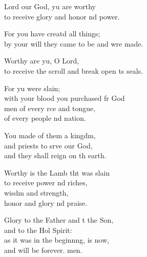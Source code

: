 \settowidth{\versewidth}{to receive the scroll and break open its seals.}
\begin{psalmverse}%
  \begin{patverse}
 Lord our God, yu are worthy\Med\\
to receive glory and honor nd power.

For you have creatd all things;\Med\\
by your will they came to be and wre made.

Worthy are yu, O Lord,\Med\\
to receive the scroll and break open \pointup{\i}ts seals.

For yu were slain;\Med\\
with your blood you purchased fr God\\
men of every rce and tongue,\Med\\
of every people nd nation.

You made of them a kingdm,\Flex\\
and priests to srve our God,\Med\\
and they shall reign on th earth.

Worthy is the Lamb tht was slain\Med\\
to receive power nd riches,\Med\\
wisdm and strength,\\
honor and glory nd praise.

Glory to the Father and t the Son,\Med\\
and to the Hol Spirit:\\
as it was in the beginnng, is now,\Med\\
and will be forever. men.
  \end{patverse}
\end{psalmverse}
